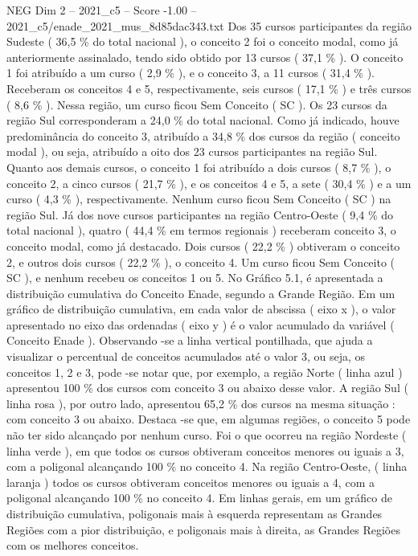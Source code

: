 \begin{textsample}{NEG Dim 2 – 2021\_c5 – Score -1.00 – 2021\_c5/enade\_2021\_mus\_8d85dac343.txt}
Dos 35 cursos participantes da região Sudeste ( 36,5 \% do total nacional ), o conceito 2 foi o conceito modal, como já anteriormente assinalado, tendo sido obtido por 13 cursos ( 37,1 \% ).
O conceito 1 foi atribuído a um curso ( 2,9 \% ), e o conceito 3, a 11 cursos ( 31,4 \% ).
Receberam os conceitos 4 e 5, respectivamente, seis cursos ( 17,1 \% ) e três cursos ( 8,6 \% ).
Nessa região, um curso ficou Sem Conceito ( SC ).
Os 23 cursos da região Sul corresponderam a 24,0 \% do total nacional.
Como já indicado, houve predominância do conceito 3, atribuído a 34,8 \% dos cursos da região ( conceito modal ), ou seja, atribuído a oito dos 23 cursos participantes na região Sul.
Quanto aos demais cursos, o conceito 1 foi atribuído a dois cursos ( 8,7 \% ), o conceito 2, a cinco cursos ( 21,7 \% ), e os conceitos 4 e 5, a sete ( 30,4 \% ) e a um curso ( 4,3 \% ), respectivamente.
Nenhum curso ficou Sem Conceito ( SC ) na região Sul.
Já dos nove cursos participantes na região Centro-Oeste ( 9,4 \% do total nacional ), quatro ( 44,4 \% em termos regionais ) receberam conceito 3, o conceito modal, como já destacado.
Dois cursos ( 22,2 \% ) obtiveram o conceito 2, e outros dois cursos ( 22,2 \% ), o conceito 4.
Um curso ficou Sem Conceito ( SC ), e nenhum recebeu os conceitos 1 ou 5.
No Gráfico 5.1, é apresentada a distribuição cumulativa do Conceito Enade, segundo a Grande Região.
Em um gráfico de distribuição cumulativa, em cada valor de abscissa ( eixo x ), o valor apresentado no eixo das ordenadas ( eixo y ) é o valor acumulado da variável ( Conceito Enade ).
Observando -se a linha vertical pontilhada, que ajuda a visualizar o percentual de conceitos acumulados até o valor 3, ou seja, os conceitos 1, 2 e 3, pode -se notar que, por exemplo, a região Norte ( linha azul ) apresentou 100 \% dos cursos com conceito 3 ou abaixo desse valor.
A região Sul ( linha rosa ), por outro lado, apresentou 65,2 \% dos cursos na mesma situação : com conceito 3 ou abaixo.
Destaca -se que, em algumas regiões, o conceito 5 pode não ter sido alcançado por nenhum curso.
Foi o que ocorreu na região Nordeste ( linha verde ), em que todos os cursos obtiveram conceitos menores ou iguais a 3, com a poligonal alcançando 100 \% no conceito 4.
Na região Centro-Oeste, ( linha laranja ) todos os cursos obtiveram conceitos menores ou iguais a 4, com a poligonal alcançando 100 \% no conceito 4.
Em linhas gerais, em um gráfico de distribuição cumulativa, poligonais mais à esquerda representam as Grandes Regiões com a pior distribuição, e poligonais mais à direita, as Grandes Regiões com os melhores conceitos.

\end{textsample}

